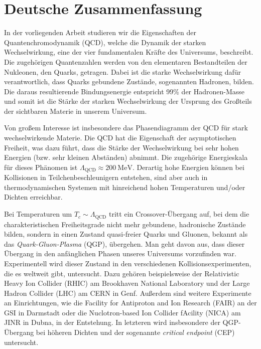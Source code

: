 \chapter*{Deutsche Zusammenfassung}
{\fontsize{12pt}{18pt}\selectfont

In der vorliegenden Arbeit studieren wir die Eigenschaften der
Quantenchromodynamik (QCD), welche die Dynamik der starken Wechselwirkung, eine
der vier fundamentalen Kräfte des Universums, beschreibt. Die zugehörigen
Quantenzahlen werden von den elementaren Bestandteilen der Nukleonen, den
Quarks, getragen. Dabei ist die starke Wechselwirkung dafür verantwortlich, dass
Quarks gebundene Zustände, sogenannten Hadronen, bilden. Die daraus
resultierende Bindungsenergie entspricht 99\% der Hadronen-Mas\-se und somit ist
die Stärke der starken Wechselwirkung der Ursprung des Groß\-teils der
sichtbaren Materie in unserem Universum.

Von großem Interesse ist insbesondere das Phasendiagramm der QCD für stark
wechselwirkende Materie. Die QCD hat die Eigenschaft der asymptotischen
Freiheit, was dazu führt, dass die Stärke der Wechselwirkung bei sehr hohen
Energien (bzw. sehr kleinen Abständen) abnimmt. Die zugehörige Energieskala für
dieses Phänomen ist $\Lambda_{\mathrm{QCD}} \approx 200 \:\mathrm{MeV}$. Derartig
hohe Energien können bei Kollisionen in Teilchenbeschleunigern entstehen, sind
aber auch in thermodynamischen Systemen mit hinreichend hohen Temperaturen
und/oder Dichten erreichbar.

Bei Temperaturen um $T_c \sim \Lambda_{\mathrm{QCD}}$ tritt ein
Crossover-Übergang auf, bei dem die charakteristischen Freiheitsgrade nicht mehr
gebundene, hadronische Zustände bilden, sondern in einen Zustand quasi-freier
Quarks und Gluonen, bekannt als das \emph{Quark-Gluon-Plasma} (QGP), übergehen.
Man geht davon aus, dass dieser Übergang in den anfänglichen Phasen unseres
Universums vorzufinden war. Experimentell wird dieser Zustand in den
verschiedenen Kollisionsexperimenten, die es weltweit gibt, untersucht. Dazu
gehören beispielsweise der Relativistic Heavy Ion Collider (RHIC) am Brookhaven
National Laboratory und der Large Hadron Collider (LHC) am CERN in Genf.
Außerdem sind weitere Experimente an Einrichtungen, wie die Facility for
Antiproton and Ion Research (FAIR) an der GSI in Darmstadt oder die
Nuclotron-based Ion Collider fAcility (NICA) am JINR in Dubna, in der
Entstehung. In letzteren wird insbesondere der QGP-Übergang bei höheren Dichten
und der sogenannte \emph{critical endpoint} (CEP) untersucht.

}

